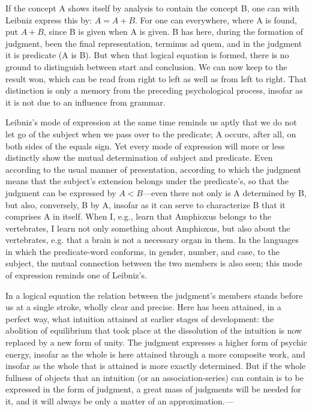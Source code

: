 \documentclass[12pt,a4paper]{book}
\newcommand{\opage}[1]{\marginnote{\footnotesize\textit{[#1]}}}
\begin{document}
If the concept A shows itself by analysis to contain the concept B, one
can with Leibniz express this by: $A = A + B$. For one can everywhere,
where A is found, put $A + B$, since B is given when A is given. B has
here, during the formation of judgment, been the final representation,
terminus ad quem, and in the judgment it is predicate (A is B). But when
that logical equation is formed, there is no ground to distinguish between
start and conclusion. We can now keep to the result won, which can be read
from right to left as well as from left to right. That distinction is only
a memory from the preceding psychological process, insofar as it is not
due to an influence from grammar.

Leibniz's mode of expression at the same time reminds us aptly that we do
not let go of the subject when we pass over to the predicate; A occurs,
after all, on both sides of the equals sign. Yet every mode of expression
will more or less distinctly show the mutual determination of subject and
predicate. Even according to the usual manner of presentation, according
to which the judgment means that the subject's extension belongs under the
predicate's, so that the judgment can be expressed by $A < B$---even there
not only is A determined by B, but also, conversely, B by A, insofar as it
can serve to characterize B that it comprises A in itself. When I, e.g.,
learn that Amphioxus belongs to the vertebrates, I learn not only something
about Amphioxus, but also about the vertebrates, e.g. that a brain is not a
necessary organ in them. In the languages in which the predicate-word
conforms, in gender, number, and case, to the subject, the mutual
connection between the two members is also seen; this mode of expression
reminds one of Leibniz's.

In a logical equation the relation between the judgment's \opage{95}members stands
before us at a single stroke, wholly clear and precise. Here has been
attained, in a perfect way, what intuition attained at earlier stages of
development: the abolition of equilibrium that took place at the
dissolution of the intuition is now replaced by a new form of unity. The
judgment expresses a higher form of psychic energy, insofar as the whole
is here attained through a more composite work, and insofar as the whole
that is attained is more exactly determined. But if the whole fullness of
objects that an intuition (or an association-series) can contain is to be
expressed in the form of judgment, a great mass of judgments will be needed
for it, and it will always be only a matter of an approximation.---
\end{document}

